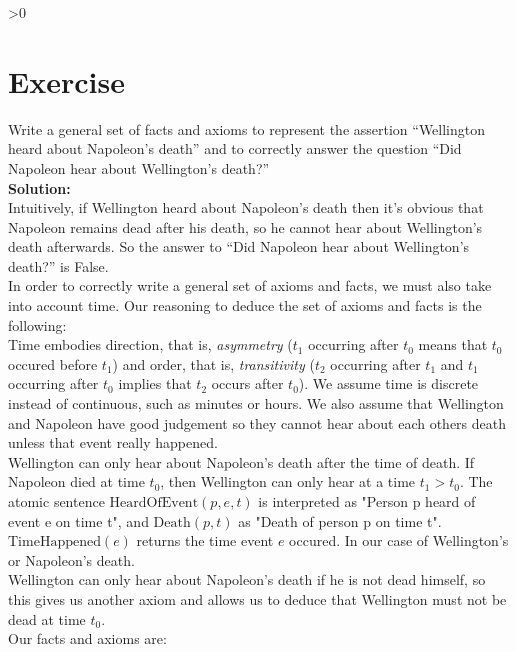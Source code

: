 \documentclass{article}
\newcounter{partCounter}
\newcounter{ExerciseCounter}
\newenvironment{Exercise}[1][-1]{
	\ifnum#1>0
	\setcounter{ExerciseCounter}{#1}
	\fi
	\section{Exercise \arabic{ExerciseCounter}}
	\setcounter{partCounter}{1}
}{
}
\newcommand{\solution}{\textbf{\large Solution:}}
\begin{document}
	
\newpage


\begin{Exercise}[2]

Write a general set of facts and axioms to represent the assertion “Wellington heard about Napoleon’s death” and to correctly answer the question “Did Napoleon hear about Wellington’s death?” \\
	
\solution \\
		
Intuitively, if Wellington heard about Napoleon's death then it's obvious that Napoleon remains dead after his death, so he cannot hear about Wellington's death afterwards. So the answer to “Did Napoleon hear about Wellington’s death?” is False. \\

In order to correctly write a general set of axioms and facts, we must also take into account time. Our reasoning to deduce the set of axioms and facts is the following: \\

Time embodies direction, that is, \textit{asymmetry} ($t_1$ occurring after $t_0$ means that $t_0$ occured before $t_1$) and order, that is, \textit{transitivity} ($t_2$ occurring after $t_1$ and $t_1$ occurring after $t_0$ implies that $t_2$ occurs after $t_0$). We assume time is discrete instead of continuous, such as minutes or hours. We also assume that Wellington and Napoleon have good judgement so they cannot hear about each others death unless that event really happened. \\

Wellington can only hear about Napoleon's death after the time of death. If Napoleon died at time $t_0$, then Wellington can only hear at a time $t_1 > t_0$. The atomic sentence $\text{HeardOfEvent}(p,e,t)$ is interpreted as "Person p heard of event e on time t", and $\text{Death}(p,t)$ as "Death of person p on time t". $\text{TimeHappened}(e)$ returns the time event $e$ occured. In our case of Wellington's or Napoleon's death. \\

Wellington can only hear about Napoleon's death if he is not dead himself, so this gives us another axiom and allows us to deduce that Wellington must not be dead at time $t_0$. \\

Our facts and axioms are:


\end{Exercise}
\end{document}
